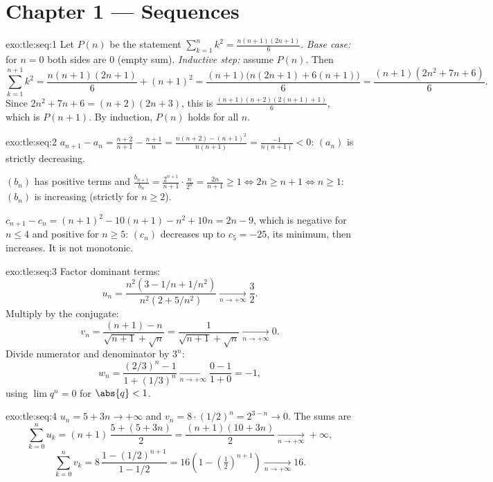 \section*{Chapter 1 --- Sequences}

\begin{solution}{exo:tle:seq:1}
Let $P(n)$ be the statement $\sum_{k=1}^{n} k^2 = \frac{n(n+1)(2n+1)}{6}$.
\emph{Base case:} for $n = 0$ both sides are $0$ (empty sum).
\emph{Inductive step:} assume $P(n)$. Then
\[
\sum_{k=1}^{n+1} k^2 = \frac{n(n+1)(2n+1)}{6} + (n+1)^2
= \frac{(n+1)\bigl(n(2n+1) + 6(n+1)\bigr)}{6}
= \frac{(n+1)(2n^2 + 7n + 6)}{6}.
\]
Since $2n^2 + 7n + 6 = (n+2)(2n+3)$, this is
$\frac{(n+1)(n+2)(2(n+1)+1)}{6}$, which is $P(n+1)$. By induction, $P(n)$
holds for all $n$.
\end{solution}

\begin{solution}{exo:tle:seq:2}
$a_{n+1} - a_n = \frac{n+2}{n+1} - \frac{n+1}{n}
= \frac{n(n+2) - (n+1)^2}{n(n+1)} = \frac{-1}{n(n+1)} < 0$: $(a_n)$ is
strictly decreasing.

$(b_n)$ has positive terms and
$\frac{b_{n+1}}{b_n} = \frac{2^{n+1}}{n+1}\cdot\frac{n}{2^n} =
\frac{2n}{n+1} \geq 1 \iff 2n \geq n+1 \iff n \geq 1$: $(b_n)$ is increasing
(strictly for $n \geq 2$).

$c_{n+1} - c_n = (n+1)^2 - 10(n+1) - n^2 + 10n = 2n - 9$, which is negative
for $n \leq 4$ and positive for $n \geq 5$: $(c_n)$ decreases up to
$c_5 = -25$, its minimum, then increases. It is not monotonic.
\end{solution}

\begin{solution}{exo:tle:seq:3}
Factor dominant terms:
\[
u_n = \frac{n^2(3 - 1/n + 1/n^2)}{n^2(2 + 5/n^2)} \xrightarrow[n\to+\infty]{} \frac{3}{2}.
\]
Multiply by the conjugate:
\[
v_n = \frac{(n+1) - n}{\sqrt{n+1} + \sqrt{n}} = \frac{1}{\sqrt{n+1}+\sqrt{n}}
\xrightarrow[n\to+\infty]{} 0.
\]
Divide numerator and denominator by $3^n$:
\[
w_n = \frac{(2/3)^n - 1}{1 + (1/3)^n} \xrightarrow[n\to+\infty]{} \frac{0-1}{1+0} = -1,
\]
using $\lim q^n = 0$ for $\abs{q} < 1$.
\end{solution}

\begin{solution}{exo:tle:seq:4}
$u_n = 5 + 3n \to +\infty$ and $v_n = 8 \cdot (1/2)^n = 2^{3-n} \to 0$.
The sums are
\[
\sum_{k=0}^{n} u_k = (n+1)\,\frac{5 + (5+3n)}{2} = \frac{(n+1)(10+3n)}{2}
\xrightarrow[n\to+\infty]{} +\infty,
\]
\[
\sum_{k=0}^{n} v_k = 8\,\frac{1 - (1/2)^{n+1}}{1 - 1/2}
= 16\left(1 - \left(\tfrac{1}{2}\right)^{n+1}\right)
\xrightarrow[n\to+\infty]{} 16 .
\]
\end{solution}

